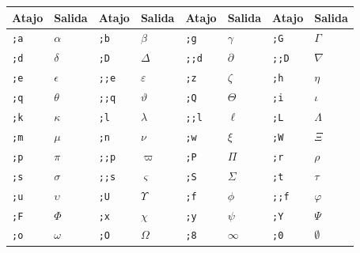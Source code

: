 \documentclass[11pt,book,spanish,alphabetic]{apuntes-scr}
\begin{document}
\begin{center}
\small
\begin{tabularx}{\linewidth}{l l l l l l l l}
\toprule
\textbf{Atajo} & \textbf{Salida} & \textbf{Atajo} & \textbf{Salida} & \textbf{Atajo} & \textbf{Salida} & \textbf{Atajo} & \textbf{Salida} \\
\midrule
\texttt{;a} & $\alpha$ & \texttt{;b} & $\beta$ & \texttt{;g} & $\gamma$ & \texttt{;G} & $\Gamma$ \\
\texttt{;d} & $\delta$ & \texttt{;D} & $\Delta$ & \texttt{;;d} & $\partial$ & \texttt{;;D} & $\nabla$ \\
\texttt{;e} & $\epsilon$ & \texttt{;;e} & $\varepsilon$ & \texttt{;z} & $\zeta$ & \texttt{;h} & $\eta$ \\
\texttt{;q} & $\theta$ & \texttt{;;q} & $\vartheta$ & \texttt{;Q} & $\Theta$ & \texttt{;i} & $\iota$ \\
\texttt{;k} & $\kappa$ & \texttt{;l} & $\lambda$ & \texttt{;;l} & $\ell$ & \texttt{;L} & $\Lambda$ \\
\texttt{;m} & $\mu$ & \texttt{;n} & $\nu$ & \texttt{;w} & $\xi$ & \texttt{;W} & $\Xi$ \\
\texttt{;p} & $\pi$ & \texttt{;;p} & $\varpi$ & \texttt{;P} & $\Pi$ & \texttt{;r} & $\rho$ \\
\texttt{;s} & $\sigma$ & \texttt{;;s} & $\varsigma$ & \texttt{;S} & $\Sigma$ & \texttt{;t} & $\tau$ \\
\texttt{;u} & $\upsilon$ & \texttt{;U} & $\Upsilon$ & \texttt{;f} & $\phi$ & \texttt{;;f} & $\varphi$ \\
\texttt{;F} & $\Phi$ & \texttt{;x} & $\chi$ & \texttt{;y} & $\psi$ & \texttt{;Y} & $\Psi$ \\
\texttt{;o} & $\omega$ & \texttt{;O} & $\Omega$ & \texttt{;8} & $\infty$ & \texttt{;0} & $\emptyset$ \\
\bottomrule
\end{tabularx}
\end{center}
\end{document}
